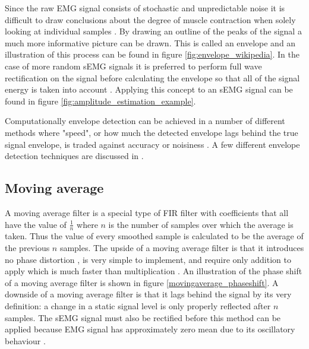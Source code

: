 Since the raw EMG signal consists of stochastic and unpredictable noise it is difficult to draw conclusions about the degree of muscle contraction when solely looking at individual samples \cite{semg_signals_analysis_and_applications}. By drawing an outline of the peaks of the signal a much more informative picture can be drawn. This is called an envelope and an illustration of this process can be found in figure \ref{fig:envelope_wikipedia}. In the case of more random sEMG signals it is preferred to perform full wave rectification on the signal before calculating the envelope so that all of the signal energy is taken into account \cite{semg_signals_analysis_and_applications}. Applying this concept to an sEMG signal can be found in figure \ref{fig:amplitude_estimation_example}.

Computationally envelope detection can be achieved in a number of different methods where "speed", or how much the detected envelope lags behind the true signal envelope, is traded against accuracy or noisiness \cite{dsp_good_bad_ugly}. A few different envelope detection techniques are discussed in \cite{rose2011electromyogram}.

\subsection{Moving average}
A moving average filter is a special type of FIR filter with coefficients that all have the value of $\frac{1}{n}$ where $n$ is the number of samples over which the average is taken. Thus the value of every smoothed sample is calculated to be the average of the previous $n$ samples. The upside of a moving average filter is that it introduces no phase distortion \cite{fir_filter_properties}, is very simple to implement, and require only addition to apply which is much faster than multiplication \cite{smith_moving_average_filters}. An illustration of the phase shift of a moving average filter is shown in figure \ref{movingaverage_phaseshift}. A downside of a moving average filter is that it lags behind the signal by its very definition: a change in a static signal level is only properly reflected after $n$ samples.  The sEMG signal must also be rectified before this method can be applied because EMG signal has approximately zero mean due to its oscillatory behaviour \cite{rose2011electromyogram}.

